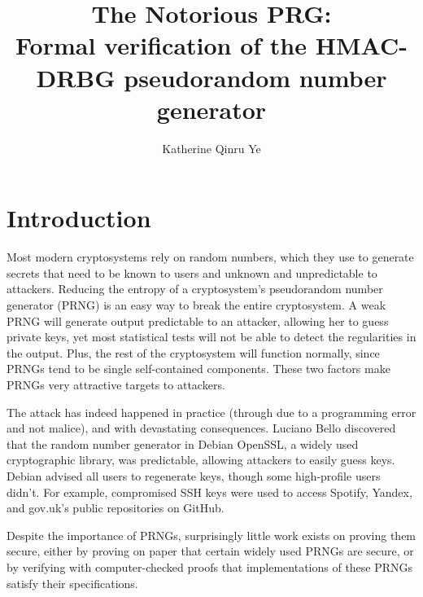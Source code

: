 \documentclass[12pt,lot, lof]{puthesis}
\title{The Notorious \textsc{PRG}:\\
Formal verification of the \textsc{HMAC-DRBG} pseudorandom number generator}
\author{Katherine Qinru Ye}
\begin{document}
\makefrontmatter



% 
% 
% 
% 
% 
% 

\chapter{Introduction}

Most modern cryptosystems rely on random numbers, which they use to generate secrets that need to be known to users and unknown and unpredictable to attackers. Reducing the entropy of a cryptosystem's pseudorandom number generator (PRNG) is an easy way to break the entire cryptosystem. A weak PRNG will generate output predictable to an attacker, allowing her to guess private keys, yet most statistical tests will not be able to detect the regularities in the output. Plus, the rest of the cryptosystem will function normally, since PRNGs tend to be single self-contained components. These two factors make PRNGs very attractive targets to attackers.

The attack has indeed happened in practice (through due to a programming error and not malice), and with devastating consequences. Luciano Bello discovered that the random number generator in Debian OpenSSL, a widely used cryptographic library, was predictable, allowing attackers to easily guess keys. Debian advised all users to regenerate keys, though some high-profile users didn't. For example, compromised SSH keys were used to access Spotify, Yandex, and gov.uk's public repositories on GitHub.

Despite the importance of PRNGs, surprisingly little work exists on proving them secure, either by proving on paper that certain widely used PRNGs are secure, or by verifying with computer-checked proofs that implementations of these PRNGs satisfy their specifications.

\end{document}
